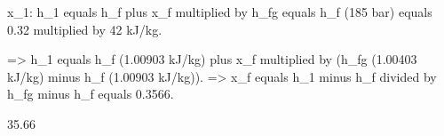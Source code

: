 x_1: h_1 equals h_f plus x_f multiplied by h_fg equals h_f (185 bar) equals 0.32 multiplied by 42 kJ/kg.  

=> h_1 equals h_f (1.00903 kJ/kg) plus x_f multiplied by (h_fg (1.00403 kJ/kg) minus h_f (1.00903 kJ/kg)).  
=> x_f equals h_1 minus h_f divided by h_fg minus h_f equals 0.3566.  

35.66%